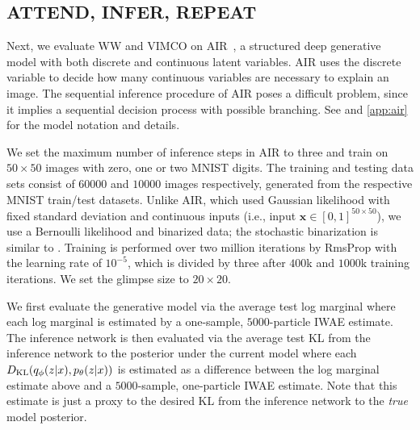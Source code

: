 \subsection{ATTEND, INFER, REPEAT}
\label{sec:experiments/air}

Next, we evaluate \gls{WW} and \gls{VIMCO}
on \gls{AIR}~\citep{eslami2016attend}, a structured deep generative model with both discrete and continuous latent variables.
%
\Gls{AIR} uses the discrete variable to decide how many continuous variables are necessary to explain an image.
%
The sequential inference procedure of \gls{AIR} poses a difficult problem, since it implies a sequential decision process with possible branching.
%
See \citep{eslami2016attend} and \cref{app:air} for the model notation and details.

We set the maximum number of inference steps in \gls{AIR} to three and train on $50 \times 50$ images with zero, one or two \acrshort{MNIST} digits.
%
The training and testing data sets consist of $60000$ and $10000$ images respectively, generated from the respective \acrshort{MNIST} train/test datasets.
%
Unlike \gls{AIR}, which used Gaussian likelihood with fixed standard deviation and continuous inputs (i.e., input $\mathbf{x} \in [0, 1]^{50 \times 50}$), we use a Bernoulli likelihood and binarized data; the stochastic binarization is similar to \citet{burda2016importance}.
%
%
Training is performed over two million iterations by RmsProp \citep{tieleman2012rms} with the learning rate of $10^{-5}$, which is divided by three after $400$k and $1000$k training iterations.
%
We set the glimpse size to $20 \times 20$.

We first evaluate the generative model via the average test log marginal where each log marginal is estimated by a one-sample, $5000$-particle \gls{IWAE} estimate.
%
The inference network is then evaluated via the average test \gls{KL} from the inference network to the posterior under the current model where each $D_{\mathrm{KL}}(q_\phi(z \lvert x), p_\theta(z \lvert x))$ is estimated as a difference between the log marginal estimate above and a $5000$-sample, one-particle \gls{IWAE} estimate.
%
Note that this estimate is just a proxy to the desired \gls{KL} from the inference network to the \emph{true} model posterior.
%

